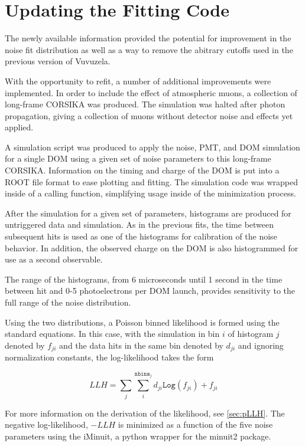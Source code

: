 \label{sec:vuvuzela_fitting}
\section{Updating the Fitting Code}
The newly available information provided the potential for improvement in the noise fit distribution as well as a way to remove the abitrary cutoffs used in the previous version of Vuvuzela.

With the opportunity to refit, a number of additional improvements were implemented.
In order to include the effect of atmospheric muons, a collection of long-frame CORSIKA was produced. 
The simulation was halted after photon propagation, giving a collection of muons without detector noise and effects yet applied.

A simulation script was produced to apply the noise, PMT, and DOM simulation for a single DOM using a given set of noise parameters to this long-frame CORSIKA.
Information on the timing and charge of the DOM is put into a ROOT file format to ease plotting and fitting.
The simulation code was wrapped inside of a calling function, simplifying usage inside of the minimization process.

After the simulation for a given set of parameters, histograms are produced for untriggered data and simulation.
As in the previous fits, the time between subsequent hits is used as one of the histograms for calibration of the noise behavior.
In addition, the observed charge on the DOM is also histogrammed for use as a second observable.

The range of the histograms, from 6 microseconds until 1 second in the time between hit and 0-5 photoelectrons per DOM launch, provides sensitivity to the full range of the noise distribution.

Using the two distributions, a Poisson binned likelihood is formed using the standard equations.
In this case, with the simulation in bin $i$ of histogram $j$ denoted by $f_{ji}$ and the data hits in the same bin denoted by $d_{ji}$ and ignoring normalization constants, the log-likelihood takes the form

\begin{equation}
	LLH = \sum_j \sum_i^{\mathtt{nbins}_j} d_{ji} \mathtt{Log}(f_{ji}) + f_{ji}
\end{equation}

For more information on the derivation of the likelihood, see \ref{sec:pLLH}.
The negative log-likelihood, $-LLH$ is minimized as a function of the five noise parameters using the iMinuit, a python wrapper for the minuit2 package.

